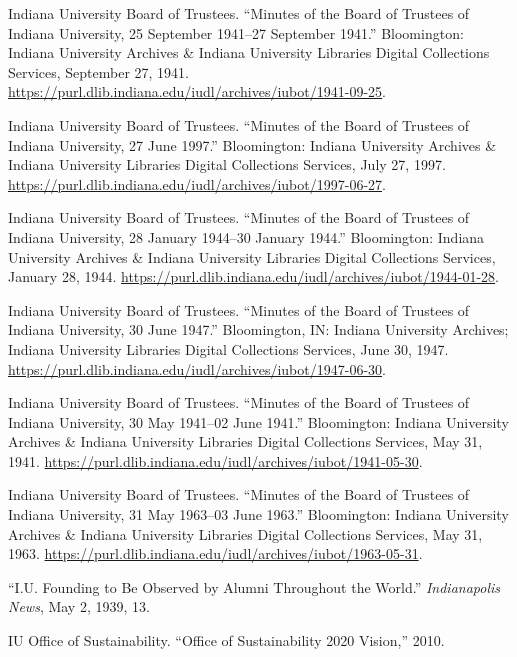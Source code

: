 \documentclass[
  american,
  letterpaper,
]{scrreprt}
\newlength{\cslhangindent}
\newenvironment{CSLReferences}[2] %
 {\begin{list}{}{%
  \setlength{\itemindent}{0pt}
  \setlength{\leftmargin}{0pt}
  \setlength{\parsep}{0pt}
  \ifodd #1
   \setlength{\leftmargin}{\cslhangindent}
   \setlength{\itemindent}{-1\cslhangindent}
  \fi
  \setlength{\itemsep}{#2\baselineskip}}}
 {\end{list}}
\begin{document}
\begin{CSLReferences}{1}{0}
Indiana University Board of Trustees. {``Minutes of the Board of
Trustees of Indiana University, 25 September 1941--27 September 1941.''}
Bloomington: Indiana University Archives \& Indiana University Libraries
Digital Collections Services, September 27, 1941.
\url{https://purl.dlib.indiana.edu/iudl/archives/iubot/1941-09-25}.

Indiana University Board of Trustees. {``Minutes of the Board of
Trustees of Indiana University, 27 June 1997.''} Bloomington: Indiana
University Archives \& Indiana University Libraries Digital Collections
Services, July 27, 1997.
\url{https://purl.dlib.indiana.edu/iudl/archives/iubot/1997-06-27}.

Indiana University Board of Trustees. {``Minutes of the Board of
Trustees of Indiana University, 28 January 1944--30 January 1944.''}
Bloomington: Indiana University Archives \& Indiana University Libraries
Digital Collections Services, January 28, 1944.
\url{https://purl.dlib.indiana.edu/iudl/archives/iubot/1944-01-28}.

Indiana University Board of Trustees. {``Minutes of the Board of
Trustees of Indiana University, 30 June 1947.''} Bloomington, IN:
Indiana University Archives; Indiana University Libraries Digital
Collections Services, June 30, 1947.
\url{https://purl.dlib.indiana.edu/iudl/archives/iubot/1947-06-30}.

Indiana University Board of Trustees. {``Minutes of the Board of
Trustees of Indiana University, 30 May 1941--02 June 1941.''}
Bloomington: Indiana University Archives \& Indiana University Libraries
Digital Collections Services, May 31, 1941.
\url{https://purl.dlib.indiana.edu/iudl/archives/iubot/1941-05-30}.

Indiana University Board of Trustees. {``Minutes of the Board of
Trustees of Indiana University, 31 May 1963--03 June 1963.''}
Bloomington: Indiana University Archives \& Indiana University Libraries
Digital Collections Services, May 31, 1963.
\url{https://purl.dlib.indiana.edu/iudl/archives/iubot/1963-05-31}.

{``{I.U.} Founding to Be Observed by Alumni Throughout the World.''}
\emph{Indianapolis News}, May 2, 1939, 13.

IU Office of Sustainability. {``Office of Sustainability 2020 Vision,''}
2010.


\end{CSLReferences}
\end{document}
